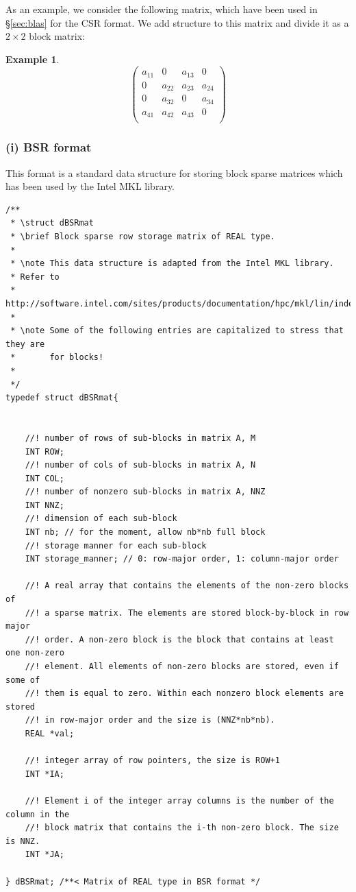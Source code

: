 \documentclass[11pt]{memoir}
\newtheorem{example}[theorem]{Example}
\begin{document}
As an example, we consider the following matrix, which have been used in \S\ref{sec:blas} for the CSR format. We add structure to this matrix and divide it as a $2 \times 2$ block matrix:
%
\begin{example}\label{ex:block}
$$
\left(
\begin{array}{cc|cc}
a_{11} & 0 & a_{13} & 0 \\
0 & a_{22} & a_{23} & a_{24} \\
\hline
0 & a_{32} & 0 & a_{34} \\
a_{41}& a_{42} & a_{43} & 0 \\
\end{array}
\right)
$$
\end{example}

\subsubsection*{(i) BSR format}
This format is a standard data structure for storing block sparse matrices which has been used by the Intel MKL library. 

\begin{lstlisting}
/**
 * \struct dBSRmat
 * \brief Block sparse row storage matrix of REAL type.
 *
 * \note This data structure is adapted from the Intel MKL library.
 * Refer to
 * http://software.intel.com/sites/products/documentation/hpc/mkl/lin/index.htm
 *
 * \note Some of the following entries are capitalized to stress that they are
 *       for blocks!
 *
 */
typedef struct dBSRmat{
	

	//! number of rows of sub-blocks in matrix A, M
	INT ROW;
	//! number of cols of sub-blocks in matrix A, N
	INT COL;
	//! number of nonzero sub-blocks in matrix A, NNZ
	INT NNZ;
	//! dimension of each sub-block
	INT nb; // for the moment, allow nb*nb full block
	//! storage manner for each sub-block
	INT storage_manner; // 0: row-major order, 1: column-major order
	
	//! A real array that contains the elements of the non-zero blocks of
	//! a sparse matrix. The elements are stored block-by-block in row major
	//! order. A non-zero block is the block that contains at least one non-zero
	//! element. All elements of non-zero blocks are stored, even if some of
	//! them is equal to zero. Within each nonzero block elements are stored
	//! in row-major order and the size is (NNZ*nb*nb).
	REAL *val;
	
	//! integer array of row pointers, the size is ROW+1
	INT *IA;
	
	//! Element i of the integer array columns is the number of the column in the
	//! block matrix that contains the i-th non-zero block. The size is NNZ.
	INT *JA;
	
} dBSRmat; /**< Matrix of REAL type in BSR format */
\end{lstlisting}
\end{document}
